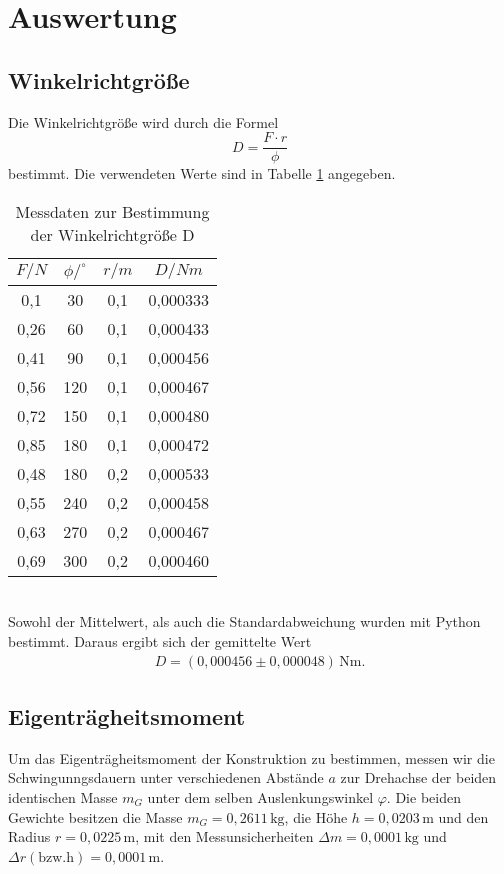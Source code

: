 \section{Auswertung}
\label{sec:Auswertung}

\subsection{Winkelrichtgröße}
\label{sec:Winkelrichtgroeße}
Die Winkelrichtgröße wird durch die Formel
\begin{equation}
  D = \frac{F \cdot r}{\phi}
\end{equation}
bestimmt. Die verwendeten Werte sind in Tabelle \ref{tab:winkelrichtgr} angegeben.
\begin{table}
  \centering
  \caption{Messdaten zur Bestimmung der Winkelrichtgröße D}
  \label{tab:winkelrichtgr}
  \begin{tabular}{c c c c}
    \toprule
    $F/N$ & $\phi /^{\circ}$ & $r/m$ & $D/Nm$ \\
    \midrule
    0,1  &  30 & 0,1 & 0,000333 \\
    0,26 &  60 & 0,1 & 0,000433 \\
    0,41 &  90 & 0,1 & 0,000456 \\
    0,56 & 120 & 0,1 & 0,000467 \\
    0,72 & 150 & 0,1 & 0,000480 \\
    0,85 & 180 & 0,1 & 0,000472 \\
    0,48 & 180 & 0,2 & 0,000533 \\
    0,55 & 240 & 0,2 & 0,000458 \\
    0,63 & 270 & 0,2 & 0,000467 \\
    0,69 & 300 & 0,2 & 0,000460 \\
    \bottomrule
  \end{tabular}
\end{table}
\\Sowohl der Mittelwert, als auch die Standardabweichung wurden mit Python bestimmt. Daraus ergibt sich der
gemittelte Wert
\begin{align*}
    D = (0{,}000456 \pm 0{,}000048)\,\mathrm{Nm} .
\end{align*}

\subsection{Eigenträgheitsmoment}
\label{sec:Eigentraegheitsmoment}
Um das Eigenträgheitsmoment der Konstruktion zu bestimmen, messen wir die Schwingunngsdauern unter verschiedenen Abstände $a$ zur Drehachse
der beiden identischen Masse $m_G$ unter dem selben Auslenkungswinkel $\varphi$.
Die beiden Gewichte besitzen die Masse $m_G = 0,2611\, \mathrm{kg}$, die Höhe $h = 0,0203\, \mathrm{m}$ und den Radius $r = 0,0225\, \mathrm{m}$, mit
den Messunsicherheiten $\Delta m = 0,0001\, \mathrm{kg}$ und $\Delta r\mathrm{(bzw. h)} = 0,0001\, \mathrm{m}$.

